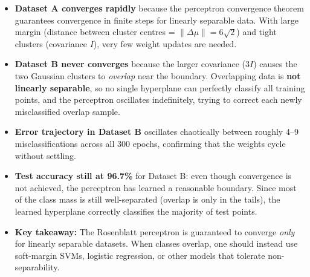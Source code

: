 \documentclass[12pt,a4paper]{article}
\begin{document}
\begin{itemize}
  \item \textbf{Dataset A converges rapidly} because the perceptron convergence theorem guarantees convergence in finite steps for linearly separable data. With large margin (distance between cluster centres = $\|\Delta\mu\|=6\sqrt{2}$) and tight clusters (covariance $I$), very few weight updates are needed.

  \item \textbf{Dataset B never converges} because the larger covariance ($3I$) causes the two Gaussian clusters to \emph{overlap} near the boundary. Overlapping data is \textbf{not linearly separable}, so no single hyperplane can perfectly classify all training points, and the perceptron oscillates indefinitely, trying to correct each newly misclassified overlap sample.

  \item \textbf{Error trajectory in Dataset B} oscillates chaotically between roughly 4--9 misclassifications across all 300 epochs, confirming that the weights cycle without settling.

  \item \textbf{Test accuracy still at 96.7\%} for Dataset B: even though convergence is not achieved, the perceptron has learned a reasonable boundary. Since most of the class mass is still well-separated (overlap is only in the tails), the learned hyperplane correctly classifies the majority of test points.

  \item \textbf{Key takeaway:} The Rosenblatt perceptron is guaranteed to converge \emph{only} for linearly separable datasets. When classes overlap, one should instead use soft-margin SVMs, logistic regression, or other models that tolerate non-separability.
\end{itemize}
\end{document}
